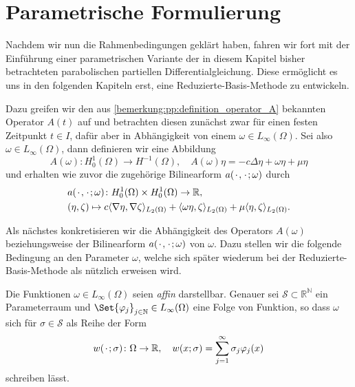 

\section{Parametrische Formulierung} %
\label{sec:parametrische_formulierung}

Nachdem wir nun die Rahmenbedingungen geklärt haben, fahren wir fort mit der Einführung einer parametrischen Variante der in diesem Kapitel bisher betrachteten parabolischen partiellen Differentialgleichung.
Diese ermöglicht es uns in den folgenden Kapiteln erst, eine Reduzierte-Basis-Methode zu entwickeln.

Dazu greifen wir den aus \cref{bemerkung:pp:definition_operator_A} bekannten Operator $A(t)$ auf und betrachten diesen zunächst zwar für einen festen Zeitpunkt $t \in I$, dafür aber in Abhängigkeit von einem $\omega \in L_{\infty}(\Omega)$.
Sei also $\omega \in L_{\infty}(\Omega)$, dann definieren wir eine Abbildung
\begin{equation}
    \label{eq:pp:op_a}
    A(\omega) \colon H^{1}_{0}(\Omega) \to H^{-1}(\Omega), \quad A(\omega) \eta = - c \Delta \eta + \omega \eta + \mu \eta
\end{equation}
und erhalten wie zuvor die zugehörige Bilinearform $a({\mkern2mu\cdot\mkern2mu}, {\mkern2mu\cdot\mkern2mu}; \omega)$ durch
\begin{equation}
    \label{eq:pp:bf_a}
    \begin{aligned}
        &a({\mkern2mu\cdot\mkern2mu}, {\mkern2mu\cdot\mkern2mu}; \omega) \colon H^{1}_{0}(\Omega) \times H^{1}_{0}(\Omega) \to \mathbb{R}, \\
        &(\eta, \zeta) \mapsto c\langle\nabla \eta,\nabla \zeta\rangle_{L_{2}(\Omega)} + \langle\omega \eta,\zeta\rangle_{L_{2}(\Omega)} + \mu \langle\eta,\zeta\rangle_{L_{2}(\Omega)}.
    \end{aligned}
\end{equation}

Als nächstes konkretisieren wir die Abhängigkeit des Operators $A(\omega)$ beziehungsweise der Bilinearform $a({\mkern2mu\cdot\mkern2mu}, {\mkern2mu\cdot\mkern2mu}; \omega)$ von $\omega$.
Dazu stellen wir die folgende Bedingung an den Parameter $\omega$, welche sich später wiederum bei der Reduzierte-Basis-Methode als nützlich erweisen wird.

\begin{Definition}
\label{definition:pp:omega_affin}
    Die Funktionen $\omega \in L_{\infty}(\Omega)$ seien \emph{affin} darstellbar.
    Genauer sei $\mathcal S \subset \mathbb{R}^{\mathbb{N}}$ ein Parameterraum und $\Set{ \varphi_{j} }_{j \in \mathbb{N}} \in L_{\infty}(\Omega)$ eine Folge von Funktion, so dass $\omega$ sich für $\sigma \in \mathcal S$ als Reihe der Form
    \begin{equation}
    \label{eq:pp:affine_zerlegung_omega}
        w({\mkern2mu\cdot\mkern2mu}; \sigma) \colon \Omega \to \mathbb{R}, \quad w(x; \sigma) = \sum_{j = 1}^{\infty} \sigma_{j} \varphi_{j}(x)
    \end{equation}
    schreiben lässt.
\end{Definition}

